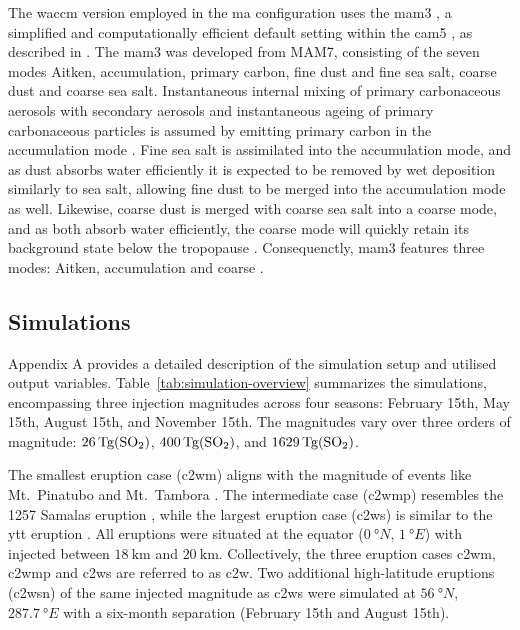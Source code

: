 \documentclass{ametsocV6.1}
\newcommand{\iso}[1][i]{{#1}njected \ce{SO2}}
\begin{document}
The \gls{waccm} version employed in the \gls{ma} configuration uses the \gls{mam3}
\citep{gettleman2019}, a simplified and computationally efficient default setting within
the \gls{cam5} \citep{liu2016}, as described in \citet{liu2012}. The \gls{mam3} was
developed from MAM7, consisting of the seven modes Aitken, accumulation, primary carbon,
fine dust and fine sea salt, coarse dust and coarse sea salt. Instantaneous internal
mixing of primary carbonaceous aerosols with secondary aerosols and instantaneous ageing
of primary carbonaceous particles is assumed by emitting primary carbon in the
accumulation mode \citep{liu2016}. Fine sea salt is assimilated into the accumulation
mode, and as dust absorbs water efficiently it is expected to be removed by wet
deposition similarly to sea salt, allowing fine dust to be merged into the accumulation
mode as well. Likewise, coarse dust is merged with coarse sea salt into a coarse mode,
and as both absorb water efficiently, the coarse mode will quickly retain its background
state below the tropopause \citep{liu2012}. Consequenctly, \gls{mam3} features three
modes: Aitken, accumulation and coarse \citep{liu2016}.

\subsection{Simulations}

Appendix A provides a detailed description of the simulation setup and utilised output
variables. Table~\ref{tab:simulation-overview} summarizes the simulations, encompassing
three  injection magnitudes across four seasons: February 15th, May 15th, August
15th, and November 15th. The magnitudes vary over three orders of magnitude:
\(\SI{26}{\tera\gram(\ce{SO2})}\), \(\SI{400}{\tera\gram(\ce{SO2})}\), and
\(\SI{1629}{\tera\gram(\ce{SO2})}\).

The smallest eruption case (\gls{c2wm}) aligns with the magnitude of events like Mt.\
Pinatubo \citep[\(\sim10\)--\(\SI{20}{\tera\gram(\ce{SO2})}\);~e.g.][]{timmreck2018} and
Mt.\ Tambora \citep[\(\sim\SI{56.2}{\tera\gram(\ce{SO2})}\);~e.g.][]{zanchettin2016}.
The intermediate case (\gls{c2wmp}) resembles the 1257 Samalas eruption
\citep[\(\sim{118.8}\)--\(\SI{173.1}{\tera\gram(\ce{SO2})}\);~e.g.][]{toohey2017,ottobliesner2016},
while the largest eruption case (\gls{c2ws}) is similar to the \gls{ytt} eruption
\citep[\(100\)--\(\SI{10000}{\tera\gram()}\);~e.g.][]{jones2005}. All eruptions
were situated at the equator (\(\SI{0}{\degree N}\), \(\SI{1}{\degree E}\)) with
\ce{SO2} injected between \(\SI{18}{\kilo\meter}\) and \(\SI{20}{\kilo\meter}\).
Collectively, the three eruption cases \gls{c2wm}, \gls{c2wmp} and \gls{c2ws} are
referred to as \gls{c2w}. Two additional high-latitude eruptions (\gls{c2wsn}) of the
same \iso{} magnitude as \gls{c2ws} were simulated at \(\SI{56}{\degree N}\),
\(\SI{287.7}{\degree E}\) with a six-month separation (February 15th and August 15th).
\end{document}

